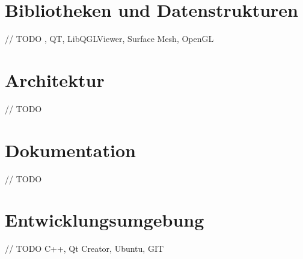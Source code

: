 \section{Bibliotheken und Datenstrukturen}

// TODO , QT, LibQGLViewer, Surface Mesh, OpenGL

\section{Architektur}

// TODO

\section{Dokumentation}

// TODO

\section{Entwicklungsumgebung}

// TODO
C++, Qt Creator, Ubuntu, GIT
